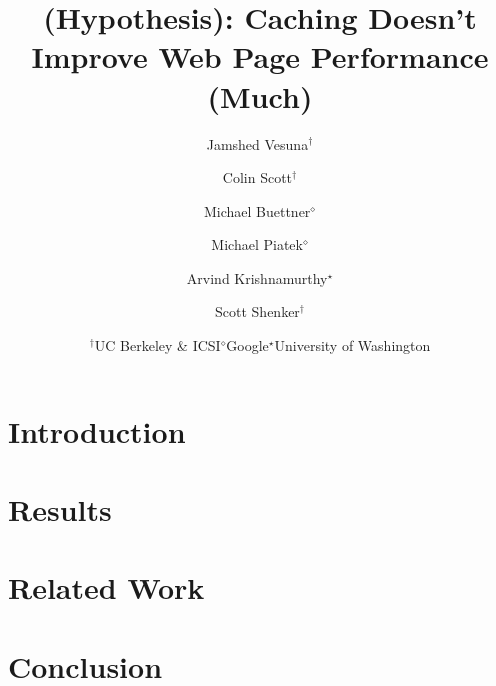 \documentclass[letterpaper,10pt,twocolumn]{article}
\title{(Hypothesis): Caching Doesn't Improve Web Page Performance (Much)}
\author{
\rm Jamshed Vesuna$^\dagger$ \hspace{-7mm}
\and \rm Colin Scott$^\dagger$ \hspace{-7mm}
\and \rm Michael Buettner$^\diamond$ \hspace{-7mm}
\and \rm Michael Piatek$^\diamond$ \hspace{-7mm}
\and \rm Arvind Krishnamurthy$^\star$ \hspace{-7mm}
\and \rm Scott Shenker$^\dagger$ \\
\and {\begin{tabular}{ccc}$^\dagger$UC Berkeley \& ICSI & $^\diamond$Google &
$^\star$University of Washington\end{tabular}}}
\begin{document}
   \date{}
   \maketitle
   \thispagestyle{empty}

\section{Introduction}
\label{sec:intro}


\section{Results}
\label{sec:results}


\section{Related Work}
\label{sec:related_work}


\section{Conclusion}
\label{sec:conclusion}



%

\end{document}
